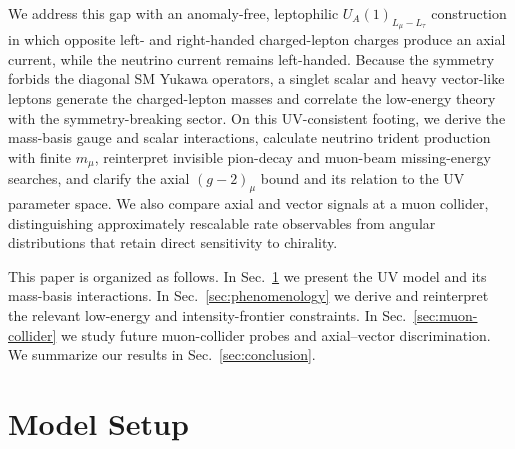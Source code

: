 \documentclass[onecolumn, aps, nofootinbib, prd, preprint, floats, floatfix, amsmath, amssymb, superscriptaddress, preprintnumbers]{revtex4-1}
\begin{document}
We address this gap with an anomaly-free, leptophilic $U_A(1)_{L_\mu-L_\tau}$ construction in which opposite left- and right-handed charged-lepton charges produce an axial current, while the neutrino current remains left-handed. Because the symmetry forbids the diagonal SM Yukawa operators, a singlet scalar and heavy vector-like leptons generate the charged-lepton masses and correlate the low-energy theory with the symmetry-breaking sector. On this UV-consistent footing, we derive the mass-basis gauge and scalar interactions, calculate neutrino trident production with finite $m_\mu$, reinterpret invisible pion-decay and muon-beam missing-energy searches, and clarify the axial $(g-2)_\mu$ bound and its relation to the UV parameter space. We also compare axial and vector signals at a muon collider, distinguishing approximately rescalable rate observables from angular distributions that retain direct sensitivity to chirality.

This paper is organized as follows. In Sec.~\ref{sec:model-setup} we present the UV model and its mass-basis interactions. In Sec.~\ref{sec:phenomenology} we derive and reinterpret the relevant low-energy and intensity-frontier constraints. In Sec.~\ref{sec:muon-collider} we study future muon-collider probes and axial--vector discrimination. We summarize our results in Sec.~\ref{sec:conclusion}.


\section{Model Setup}
\label{sec:model-setup}
\end{document}
